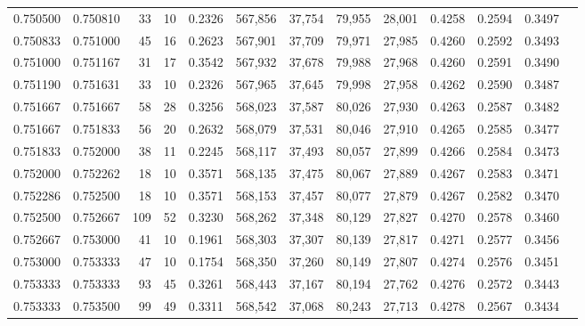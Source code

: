 \begin{tabular}{rrrrrrrrrrrrr}
0.750500 & 0.750810 &    33 &  10 &                                     0.2326 & 567,856 &  37,754 &  79,955 &  28,001 & 0.4258 & 0.2594 & 0.3497 \\
0.750833 & 0.751000 &    45 &  16 &                                     0.2623 & 567,901 &  37,709 &  79,971 &  27,985 & 0.4260 & 0.2592 & 0.3493 \\
0.751000 & 0.751167 &    31 &  17 &                                     0.3542 & 567,932 &  37,678 &  79,988 &  27,968 & 0.4260 & 0.2591 & 0.3490 \\
0.751190 & 0.751631 &    33 &  10 &                                     0.2326 & 567,965 &  37,645 &  79,998 &  27,958 & 0.4262 & 0.2590 & 0.3487 \\
0.751667 & 0.751667 &    58 &  28 &                                     0.3256 & 568,023 &  37,587 &  80,026 &  27,930 & 0.4263 & 0.2587 & 0.3482 \\
0.751667 & 0.751833 &    56 &  20 &                                     0.2632 & 568,079 &  37,531 &  80,046 &  27,910 & 0.4265 & 0.2585 & 0.3477 \\
0.751833 & 0.752000 &    38 &  11 &                                     0.2245 & 568,117 &  37,493 &  80,057 &  27,899 & 0.4266 & 0.2584 & 0.3473 \\
0.752000 & 0.752262 &    18 &  10 &                                     0.3571 & 568,135 &  37,475 &  80,067 &  27,889 & 0.4267 & 0.2583 & 0.3471 \\
0.752286 & 0.752500 &    18 &  10 &                                     0.3571 & 568,153 &  37,457 &  80,077 &  27,879 & 0.4267 & 0.2582 & 0.3470 \\
0.752500 & 0.752667 &   109 &  52 &                                     0.3230 & 568,262 &  37,348 &  80,129 &  27,827 & 0.4270 & 0.2578 & 0.3460 \\
0.752667 & 0.753000 &    41 &  10 &                                     0.1961 & 568,303 &  37,307 &  80,139 &  27,817 & 0.4271 & 0.2577 & 0.3456 \\
0.753000 & 0.753333 &    47 &  10 &                                     0.1754 & 568,350 &  37,260 &  80,149 &  27,807 & 0.4274 & 0.2576 & 0.3451 \\
0.753333 & 0.753333 &    93 &  45 &                                     0.3261 & 568,443 &  37,167 &  80,194 &  27,762 & 0.4276 & 0.2572 & 0.3443 \\
0.753333 & 0.753500 &    99 &  49 &                                     0.3311 & 568,542 &  37,068 &  80,243 &  27,713 & 0.4278 & 0.2567 & 0.3434 \\

\end{tabular}
